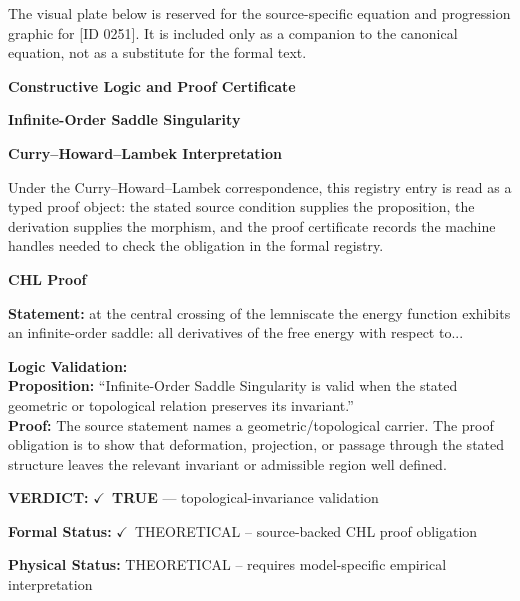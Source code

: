 \begingroup\footnotesize\sloppy
The visual plate below is reserved for the source-specific equation and progression graphic for [ID 0251]. It is included only as a companion to the canonical equation, not as a substitute for the formal text.
\par\endgroup
\ifTZPDarkEdition
{}
\fi

\clearpage
\begingroup\tzpsupportsetup
\noindent\textbf{\fontsize{10.8pt}{12.8pt}\selectfont [ID 0251] Constructive Logic and Proof Certificate}\par
\noindent\textbf{\fontsize{10pt}{12pt}\selectfont Infinite-Order Saddle Singularity}\par
\vspace{0.45em}
\begingroup
\footnotesize
\setlength{\parskip}{0.22em}
\setlength{\parindent}{0pt}
\noindent\textbf{Curry--Howard--Lambek Interpretation}\par
Under the Curry--Howard--Lambek correspondence, this registry entry is read as a typed proof
object: the stated source condition supplies the proposition, the derivation supplies the
morphism, and the proof certificate records the machine handles needed to check the obligation
in the formal registry.

\vspace{0.45em}
\noindent\textbf{CHL Proof}\par
\textbf{Statement:} at the central crossing of the lemniscate the energy function exhibits an infinite-order
saddle: all derivatives of the free energy with respect to...

\textbf{Logic Validation:}\\
\textbf{Proposition:} ``Infinite-Order Saddle Singularity is valid when the stated geometric or topological
relation preserves its invariant.''\\
\textbf{Proof:} The source statement names a geometric/topological carrier. The proof obligation is to
show that deformation, projection, or passage through the stated structure leaves the
relevant invariant or admissible region well defined.

\textbf{VERDICT:} \ensuremath{\checkmark}\ \textbf{TRUE} --- topological-invariance validation

\textbf{Formal Status:} \ensuremath{\checkmark}\ THEORETICAL -- source-backed CHL proof obligation

\textbf{Physical Status:} THEORETICAL -- requires model-specific empirical interpretation
\par\vspace{0.45em}
\par
\ifTZPDarkEdition
{}
\fi
\endgroup
\endgroup
